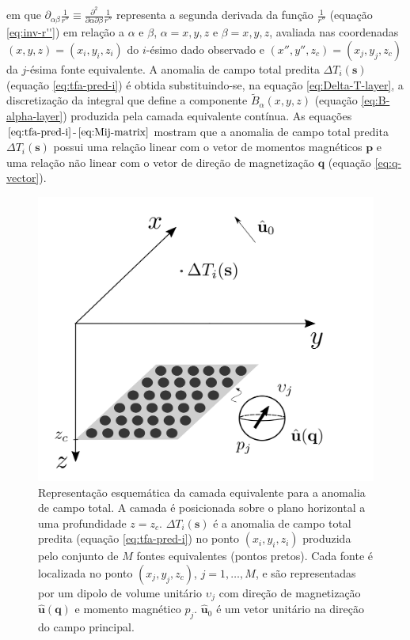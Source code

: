 em que $\partial_{\alpha\beta} \frac{1}{r''} \equiv \frac{\partial^{2}}{\partial \alpha \partial \beta} \frac{1}{r''}$ 
representa a segunda derivada da função $\frac{1}{r''}$ (equação \ref{eq:inv-r''}) em relação a $\alpha$ e $\beta$, 
$\alpha = x, y, z$ e $\beta = x, y, z$, avaliada nas coordenadas $(x, y, z) = (x_{i}, y_{i}, z_{i})$ do $i$-ésimo dado  
observado e $(x'', y'', z_{c}) = (x_{j}, y_{j}, z_{c})$ da $j$-ésima fonte equivalente.
A anomalia de campo total predita $\Delta T_{i}(\mathbf{s})$ (equação \ref{eq:tfa-pred-i}) é 
obtida substituindo-se, na equação \ref{eq:Delta-T-layer}, a 
discretização da integral que define a componente $\tilde{B}_{\alpha}(x, y, z)$
(equação \ref{eq:B-alpha-layer}) produzida pela camada equivalente contínua.
As equações $\ref{eq:tfa-pred-i}$-$\ref{eq:Mij-matrix}$ mostram que a anomalia de campo total predita 
$\Delta T_{i}(\mathbf{s})$ possui uma relação linear com o vetor de momentos magnéticos $\mathbf{p}$ e uma 
relação não linear com o vetor de direção de magnetização $\mathbf{q}$ (equação \ref{eq:q-vector}).


\begin{figure}[H]
	\centering
	\includegraphics[width=.7\textwidth]{Fig/eqlayer/eqlayer_figure_tfa.png}
	\caption{Representação esquemática da camada equivalente para a anomalia de campo total. A camada é posicionada 
	sobre o plano horizontal a uma profundidade $z=z_{c}$. $\Delta T_{i}(\mathbf{s})$ é a anomalia de campo total predita 
	(equação \ref{eq:tfa-pred-i}) no ponto 
	$(x_{i},y_{i},z_{i})$ produzida pelo conjunto de $M$ fontes equivalentes (pontos pretos). Cada fonte é localizada 
	no ponto  $(x_{j},y_{j},z_{c})$, $j = 1, \dots, M$, e são representadas por um dipolo de volume unitário 
	$\upsilon_{j}$ com direção de magnetização $\hat{\mathbf{u}}(\mathbf{q})$ e momento magnético $p_{j}$. 
	$\hat{\mathbf{u}}_{0}$ é um vetor unitário na direção do campo principal.}
	\label{fig:eqlayer_tfa_sketch}
\end{figure}

